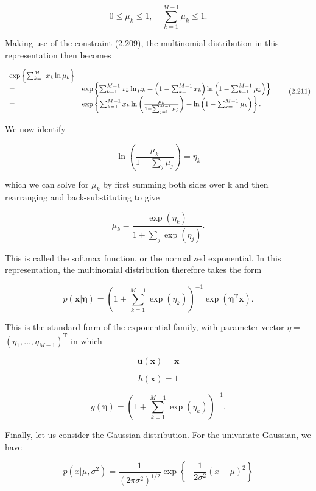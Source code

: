 \documentclass[
  10
]{article}
\begin{document}
\[
0 \leqslant \mu_ {k} \leqslant 1, \quad \sum_ {k = 1} ^ {M - 1} \mu_ {k} \leqslant 1.\tag{2.210}
\]

Making use of the constraint (2.209), the multinomial distribution in
this representation then becomes

\[
\begin{array}{l l} \exp \left\{\sum_ {k = 1} ^ {M} x _ {k} \ln \mu_ {k} \right\} \\ = & \exp \left\{\sum_ {k = 1} ^ {M - 1} x _ {k} \ln \mu_ {k} + \left(1 - \sum_ {k = 1} ^ {M - 1} x _ {k}\right) \ln \left(1 - \sum_ {k = 1} ^ {M - 1} \mu_ {k}\right) \right\} \\ = & \exp \left\{\sum_ {k = 1} ^ {M - 1} x _ {k} \ln \left(\frac {\mu_ {k}}{1 - \sum_ {j = 1} ^ {M - 1} \mu_ {j}}\right) + \ln \left(1 - \sum_ {k = 1} ^ {M - 1} \mu_ {k}\right) \right\}. \end{array}\tag{2.211}
\]

We now identify

\[
\ln \left(\frac {\mu_ {k}}{1 - \sum_ {j} \mu_ {j}}\right) = \eta_ {k}\tag{2.212}
\]

which we can solve for \(\mu _ { k }\) by first summing both sides over
k and then rearranging and back-substituting to give

\[
\mu_ {k} = \frac {\exp (\eta_ {k})}{1 + \sum_ {j} \exp (\eta_ {j})}.\tag{2.213}
\]

This is called the softmax function, or the normalized exponential. In
this representation, the multinomial distribution therefore takes the
form

\[
p (\mathbf {x} | \boldsymbol {\eta}) = \left(1 + \sum_ {k = 1} ^ {M - 1} \exp (\eta_ {k})\right) ^ {- 1} \exp (\boldsymbol {\eta} ^ {\mathrm{T}} \mathbf {x}).\tag{2.214}
\]

This is the standard form of the exponential family, with parameter
vector \(\eta =\)
\(( \eta _ { 1 } , \dots , \eta _ { M - 1 } ) ^ { \mathrm { T } }\) in
which

\[
\mathbf {u} (\mathbf {x}) = \mathbf {x}\tag{2.215}
\]

\[
h (\mathbf {x}) = 1\tag{2.216}
\]

\[
g (\boldsymbol {\eta}) = \left(1 + \sum_ {k = 1} ^ {M - 1} \exp (\eta_ {k})\right) ^ {- 1}.\tag{2.217}
\]

Finally, let us consider the Gaussian distribution. For the univariate
Gaussian, we have

\[
{p (x | \mu , \sigma^ {2})} = {\frac {1}{(2 \pi \sigma^ {2}) ^ {1 / 2}} \exp \left\{- \frac {1}{2 \sigma^ {2}} (x - \mu) ^ {2} \right\}}\tag{2.218}
\]
\end{document}
